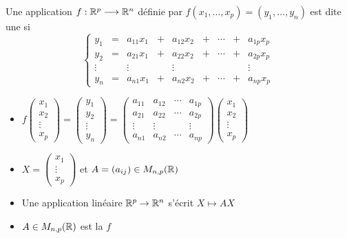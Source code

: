 \begin{frame}
\begin{mydefinition}
Une application $f: \mathbb{R}^p  \longrightarrow \mathbb{R}^n$ définie par $f(x_1, \dots , x_p) = (y_1, \dots , y_n)$
est dite une  si 
\vspace*{-2ex}
 $$  \left\{
\begin{array}{ccccccccc}
y_1 & = &a_{11}x_1 &+ &a_{12} x_2 & + & \cdots & + & a_{1p}x_p\\
y_2 & = & a_{21} x_1 & + & a_{22} x_2 & + & \cdots & + & a_{2p} x_p\\
\vdots &&\vdots &&\vdots & & & &\vdots\\
y_n & = & a_{n1}x_1 & + & a_{n2}x_2 &+&\cdots & +& a_{np} x_p\, 
\end{array}\right.
$$
\end{mydefinition}

\pause

\begin{itemize}[<+->]
  \item $f\left(\begin{smallmatrix} x_1\\x_2 \\ \vdots \\x_p \end{smallmatrix}\right)= 
\left(\begin{smallmatrix} y_1\\ y_2\\ \vdots\\ y_n  \end{smallmatrix}\right) = 
\left(\begin{smallmatrix}
a_{11} & a_{12} & \cdots & a_{1p}\\
a_{21} & a_{22} & \cdots & a_{2p}\\
\vdots & \vdots & & \vdots\\
a_{n1}& a_{n2} & \cdots & a_{np}  
\end{smallmatrix}\right)
\left(\begin{smallmatrix} x_1\\x_2 \\ \vdots \\x_p \end{smallmatrix}\right)
$
  
  \item $X= \left(\begin{smallmatrix} x_1\\ \vdots \\x_p \end{smallmatrix}\right)$ et 
$A = (a_{ij}) \in M_{n,p}(\mathbb{R})$ 
  
  \item Une application linéaire $\mathbb{R}^p \to \mathbb{R}^n$ s'écrit $X \mapsto A X$
  
  \item $A\in M_{n,p}(\mathbb{R})$ est la  $f$
  
\end{itemize}
\end{frame}


